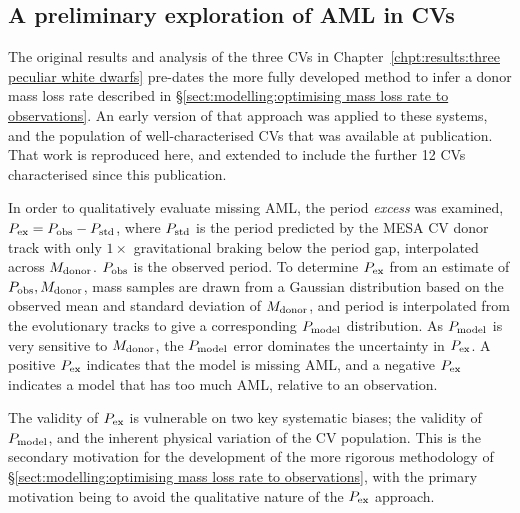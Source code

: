 


\newpage
\subsection{A preliminary exploration of AML in CVs}
\label{sect:discussion AML}

The original results and analysis of the three CVs in Chapter~\ref{chpt:results:three peculiar white dwarfs} pre-dates the more fully developed method to infer a donor mass loss rate described in \S\ref{sect:modelling:optimising mass loss rate to observations}. An early version of that approach was applied to these systems, and the population of well-characterised CVs that was available at publication. That work is reproduced here, and extended to include the further 12 CVs characterised since this publication.

In order to qualitatively evaluate missing AML, the period \textit{excess} was examined, $P_{\rm ex} = P_{\rm obs} - P_{\rm std}$, where $P_{\rm std}$ is the period predicted by the MESA CV donor track with only $1\times$ gravitational braking below the period gap, interpolated across $M_{\rm donor}$. $P_{\rm obs}$ is the observed period.
To determine $P_{\rm ex}$ from an estimate of $P_{\rm obs}, M_{\rm donor}$, mass samples are drawn from a Gaussian distribution based on the observed mean and standard deviation of $M_{\rm donor}$, and period is interpolated from the evolutionary tracks to give a corresponding $P_{\rm model}$ distribution. As $P_{\rm model}$ is very sensitive to $M_{\rm donor}$, the $P_{\rm model}$ error dominates the uncertainty in $P_{\rm ex}$.
A positive $P_{\rm ex}$ indicates that the model is missing AML, and a negative $P_{\rm ex}$ indicates a model that has too much AML, relative to an observation.

The validity of $P_{\rm ex}$ is vulnerable on two key systematic biases; the validity of $P_{\rm model}$, and the inherent physical variation of the CV population. This is the secondary motivation for the development of the more rigorous methodology of \S\ref{sect:modelling:optimising mass loss rate to observations}, with the primary motivation being to avoid the qualitative nature of the $P_{\rm ex}$ approach.


